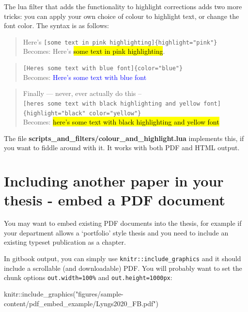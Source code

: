 \documentclass[a4paper, nobind]{templates/ociamthesis}
\newenvironment{Shaded}{\begin{snugshade}}{\end{snugshade}}
\newcommand{\FunctionTok}[1]{\textcolor[rgb]{0.00,0.00,0.00}{#1}}
\newcommand{\NormalTok}[1]{#1}
\newcommand{\SpecialCharTok}[1]{\textcolor[rgb]{0.00,0.00,0.00}{#1}}
\newcommand{\StringTok}[1]{\textcolor[rgb]{0.31,0.60,0.02}{#1}}
\renewenvironment{Shaded}
{
  \vspace{10pt}%
  \begin{snugshade}%
}{%
  \end{snugshade}%
  \vspace{8pt}%
}
\begin{document}
The lua filter that adds the functionality to highlight corrections adds two more tricks:
you can apply your own choice of colour to highlight text, or change the font color.
The syntax is as follows:

\begin{quote}
Here's \texttt{{[}some\ text\ in\ pink\ highlighting{]}\{highlight="pink"\}}\\
Becomes: Here's \hl{some text in pink highlighting}.
\end{quote}

\begin{quote}
\texttt{{[}Here\textquotesingle{}s\ some\ text\ with\ blue\ font{]}\{color="blue"\}}~\\
Becomes: \textcolor{blue}{Here's some text with blue font}
\end{quote}

\begin{quote}
Finally --- never, ever actually do this -- \texttt{{[}here\textquotesingle{}s\ some\ text\ with\ black\ highlighting\ and\ yellow\ font{]}\{highlight="black"\ color="yellow"\}}\\
Becomes: \textcolor{yellow}{\hl{here's some text with black highlighting and yellow font}}
\end{quote}

The file \textbf{scripts\_and\_filters/colour\_and\_highlight.lua} implements this, if you want to fiddle around with it.
It works with both PDF and HTML output.

\hypertarget{embed-pdf}{%
\section{Including another paper in your thesis - embed a PDF document}\label{embed-pdf}}

You may want to embed existing PDF documents into the thesis, for example if your department allows a `portfolio' style thesis and you need to include an existing typeset publication as a chapter.

In gitbook output, you can simply use \texttt{knitr::include\_graphics} and it should include a scrollable (and downloadable) PDF.
You will probably want to set the chunk options \texttt{out.width=\textquotesingle{}100\%\textquotesingle{}} and \texttt{out.height=\textquotesingle{}1000px\textquotesingle{}}:

\begin{Shaded}
\begin{Highlighting}[]
\NormalTok{knitr}\SpecialCharTok{::}\FunctionTok{include\_graphics}\NormalTok{(}\StringTok{"figures/sample{-}content/pdf\_embed\_example/Lyngs2020\_FB.pdf"}\NormalTok{)}
\end{Highlighting}
\end{Shaded}
\end{document}
